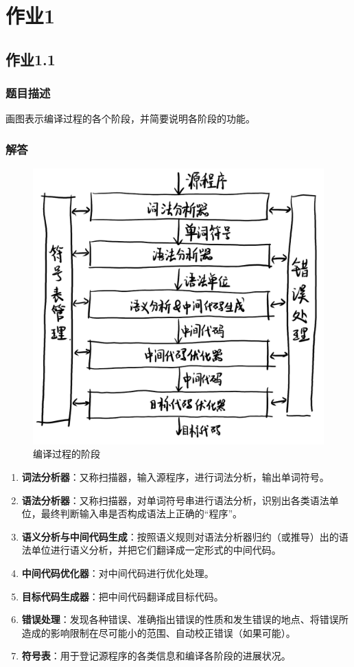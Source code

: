 
\section{作业1}
\subsection{作业1.1}
\subsubsection{题目描述}
画图表示编译过程的各个阶段，并简要说明各阶段的功能。

\subsubsection{解答}
\begin{figure}[H]
    \centering
    \includegraphics[width=0.6\linewidth]{imgs/编译过程.png}
    \caption{编译过程的阶段}
    \label{fig:编译过程阶段}
\end{figure}

\begin{enumerate}
\item \textbf{词法分析器}：又称扫描器，输入源程序，进行词法分析，输出单词符号。
\item \textbf{语法分析器}：又称扫描器，对单词符号串进行语法分析，识别出各类语法单位，最终判断输入串是否构成语法上正确的“程序”。
\item \textbf{语义分析与中间代码生成}：按照语义规则对语法分析器归约（或推导）出的语法单位进行语义分析，并把它们翻译成一定形式的中间代码。
\item \textbf{中间代码优化器}：对中间代码进行优化处理。
\item \textbf{目标代码生成器}：把中间代码翻译成目标代码。
\item \textbf{错误处理}：发现各种错误、准确指出错误的性质和发生错误的地点、将错误所造成的影响限制在尽可能小的范围、自动校正错误（如果可能）。
\item \textbf{符号表}：用于登记源程序的各类信息和编译各阶段的进展状况。
\end{enumerate}

